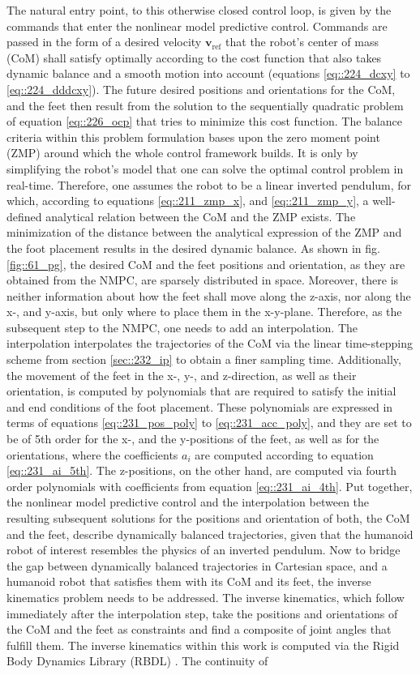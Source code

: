 The natural entry point, to this otherwise closed control loop, is given by the commands that enter the nonlinear model predictive control. Commands are passed in the form of a desired velocity $\mathbf{v}_\text{ref}$ that the robot's center of mass (CoM) shall satisfy optimally according to the cost function that also takes dynamic balance and a smooth motion into account (equations \ref{eq::224_dcxy} to \ref{eq::224_dddcxy}). The future desired positions and orientations for the CoM, and the feet then result from the solution to the sequentially quadratic problem of equation \ref{eq::226_ocp} that tries to minimize this cost function. The balance criteria within this problem formulation bases upon the zero moment point (ZMP) around which the whole control framework builds. It is only by simplifying the robot's model that one can solve the optimal control problem in real-time. Therefore, one assumes the robot to be a linear inverted pendulum, for which, according to equations \ref{eq::211_zmp_x}, and \ref{eq::211_zmp_y}, a well-defined analytical relation between the CoM and the ZMP exists. The minimization of the distance between the analytical expression of the ZMP and the foot placement results in the desired dynamic balance. As shown in fig. \ref{fig::61_pg}, the desired CoM and the feet positions and orientation, as they are obtained from the NMPC, are sparsely distributed in space. Moreover, there is neither information about how the feet shall move along the z-axis, nor along the x-, and y-axis, but only where to place them in the x-y-plane. Therefore, as the subsequent step to the NMPC, one needs to add an interpolation. The interpolation interpolates the trajectories of the CoM via the linear time-stepping scheme from section \ref{sec::232_ip} to obtain a finer sampling time. Additionally, the movement of the feet in the x-, y-, and z-direction, as well as their orientation, is computed by polynomials that are required to satisfy the initial and end conditions of the foot placement. These polynomials are expressed in terms of equations \ref{eq::231_pos_poly} to \ref{eq::231_acc_poly}, and they are set to be of 5th order for the x-, and the y-positions of the feet, as well as for the orientations, where the coefficients $a_i$ are computed according to equation \ref{eq::231_ai_5th}. The z-positions, on the other hand, are computed via fourth order polynomials with coefficients from equation \ref{eq::231_ai_4th}. Put together, the nonlinear model predictive control and the interpolation between the resulting subsequent solutions for the positions and orientation of both, the CoM and the feet, describe dynamically balanced trajectories, given that the humanoid robot of interest resembles the physics of an inverted pendulum. Now to bridge the gap between dynamically balanced trajectories in Cartesian space, and a humanoid robot that satisfies them with its CoM and its feet, the inverse kinematics problem needs to be addressed. The inverse kinematics, which follow immediately after the interpolation step, take the positions and orientations of the CoM and the feet as constraints and find a composite of joint angles that fulfill them. The inverse kinematics within this work is computed via the Rigid Body Dynamics Library (RBDL) \cite{felis2017rbdl}. The continuity of 